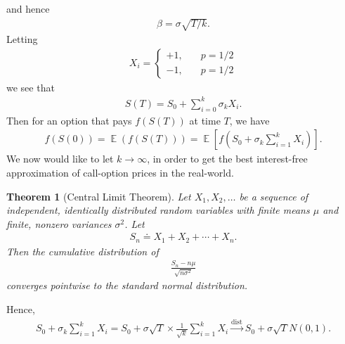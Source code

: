 \documentclass[12pt]{article}
\DeclareMathOperator{\ex}{\mathbb{E}}
\theoremstyle{plain}
\newtheorem{theorem}{Theorem}
\theoremstyle{definition}
\theoremstyle{remark}
\numberwithin{equation}{section}  %
\begin{document}
and hence
\begin{equation*}
	\begin{split}
		\beta = \sigma \sqrt{T/k}.
	\end{split}
\end{equation*}
Letting
\begin{equation*}
	\begin{split}
		X_{i} = 
		\begin{cases}
			+1, & \quad p=1/2 \\
			-1, & \quad p=1/2
		\end{cases}
	\end{split}
\end{equation*}
we see that
\begin{equation*}
	\begin{split}
		S(T) = S_{0} + \sum_{i = 0}^{k} \sigma_{k} X_{i}.
	\end{split}
\end{equation*}
Then for an option that pays $f(S(T))$ at time $T$, we have
\begin{equation*}
	\begin{split}
		f(S(0)) = \ex(f(S(T)))
		= \ex[f(S_{0} + \sigma_{k} \sum_{i=1}^{k} X_{i})].
	\end{split}
\end{equation*}
We now would like to let $k \to \infty$, in order to get the best interest-free
approximation of call-option prices in the real-world.
\begin{theorem}[Central Limit Theorem]\label{thm:central-lim-thm}
	Let $X_{1}, X_{2}, \ldots$ be a sequence of independent, identically
	distributed random variables with finite means $\mu$ and finite, nonzero
	variances $\sigma^{2}$. Let
	\begin{equation*}
		\begin{split}
			S_{n} \doteq X_{1} + X_{2} + \cdots + X_{n}.
		\end{split}
	\end{equation*}
	Then the cumulative distribution of 
	\begin{equation*}
		\begin{split}
			\frac{S_{n} - n \mu}{\sqrt{n \sigma^{2}}}
		\end{split}
	\end{equation*}
	converges pointwise to the standard normal distribution.
\end{theorem}
Hence,
\begin{equation*}
	\begin{split}
		S_{0} + \sigma_{k} \sum_{i = 1}^{k} X_{i}
		= S_{0} + \sigma \sqrt{T} \times \frac{1}{\sqrt{k}} \sum_{i = 1}^{k}
		X_{i}
		\xrightarrow{\text{dist}} S_{0} + \sigma \sqrt{T} N(0,1).
	\end{split}
\end{equation*}
\end{document}
